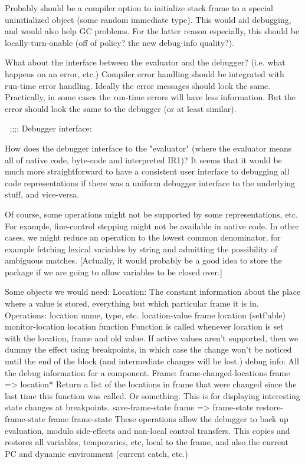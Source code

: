 Probably should be a compiler option to initialize stack frame to a special
uninitialized object (some random immediate type).  This would aid debugging,
and would also help GC problems.  For the latter reason especially, this should
be locally-turn-onable (off of policy?  the new debug-info quality?).


What about the interface between the evaluator and the debugger? (i.e. what
happens on an error, etc.)  Compiler error handling should be integrated with
run-time error handling.  Ideally the error messages should look the same.
Practically, in some cases the run-time errors will have less information.  But
the error should look the same to the debugger (or at least similar).



;;;; Debugger interface:

How does the debugger interface to the "evaluator" (where the evaluator means
all of native code, byte-code and interpreted IR1)?  It seems that it would be
much more straightforward to have a consistent user interface to debugging
all code representations if there was a uniform debugger interface to the
underlying stuff, and vice-versa.  

Of course, some operations might not be supported by some representations, etc.
For example, fine-control stepping might not be available in native code.
In other cases, we might reduce an operation to the lowest common denominator,
for example fetching lexical variables by string and admitting the possibility
of ambiguous matches.  [Actually, it would probably be a good idea to store the
package if we are going to allow variables to be closed over.]

Some objects we would need:
Location:
	The constant information about the place where a value is stored,
        everything but which particular frame it is in.  Operations:
        location name, type, etc.
        location-value frame location (setf'able)
	monitor-location location function
            Function is called whenever location is set with the location,
            frame and old value.  If active values aren't supported, then we
            dummy the effect using breakpoints, in which case the change won't
            be noticed until the end of the block (and intermediate changes
            will be lost.)
debug info:
        All the debug information for a component.
Frame:
	frame-changed-locations frame => location*
            Return a list of the locations in frame that were changed since the
            last time this function was called.  Or something.  This is for
            displaying interesting state changes at breakpoints.
	save-frame-state frame => frame-state
	restore-frame-state frame frame-state
	    These operations allow the debugger to back up evaluation, modulo
	    side-effects and non-local control transfers.  This copies and
	    restores all variables, temporaries, etc, local to the frame, and
	    also the current PC and dynamic environment (current catch, etc.)

